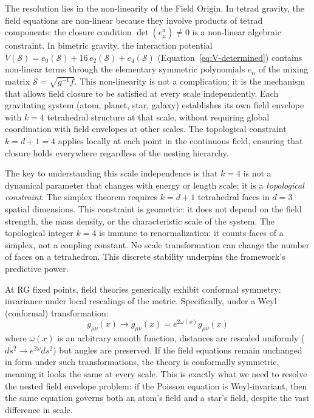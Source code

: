 \documentclass[aps,prd,preprint,superscriptaddress,showpacs,preprintnumbers,amsmath,amssymb,nofootinbib]{revtex4-2}
\begin{document}
The resolution lies in the non-linearity of the Field Origin. In tetrad gravity, the field equations are non-linear because they involve products of tetrad components: the closure condition $\det(e_\mu^a) \neq 0$ is a non-linear algebraic constraint. In bimetric gravity, the interaction potential $V(\mathcal{S}) = e_0(\mathcal{S}) + 16\,e_2(\mathcal{S}) + e_4(\mathcal{S})$ (Equation~\ref{eq:V-determined}) contains non-linear terms through the elementary symmetric polynomials $e_n$ of the mixing matrix $\mathcal{S} = \sqrt{g^{-1}f}$. This non-linearity is not a complication; it is the mechanism that allows field closure to be satisfied at every scale independently. Each gravitating system (atom, planet, star, galaxy) establishes its own field envelope with $k=4$ tetrahedral structure at that scale, without requiring global coordination with field envelopes at other scales. The topological constraint $k = d+1 = 4$ applies locally at each point in the continuous field, ensuring that closure holds everywhere regardless of the nesting hierarchy.


The key to understanding this scale independence is that $k=4$ is not a dynamical parameter that changes with energy or length scale; it is a \emph{topological constraint}. The simplex theorem requires $k = d+1$ tetrahedral faces in $d=3$ spatial dimensions. This constraint is geometric: it does not depend on the field strength, the mass density, or the characteristic scale of the system. The topological integer $k=4$ is immune to renormalization: it counts faces of a simplex, not a coupling constant. No scale transformation can change the number of faces on a tetrahedron. This discrete stability underpins the framework's predictive power.

At RG fixed points, field theories generically exhibit conformal symmetry: invariance under local rescalings of the metric. Specifically, under a Weyl (conformal) transformation:
\begin{equation}
g_{\mu\nu}(x) \to \tilde{g}_{\mu\nu}(x) = e^{2\omega(x)} g_{\mu\nu}(x)
\label{eq:weyl-transformation}
\end{equation}
where $\omega(x)$ is an arbitrary smooth function, distances are rescaled uniformly ($ds^2 \to e^{2\omega} ds^2$) but angles are preserved. If the field equations remain unchanged in form under such transformations, the theory is conformally symmetric, meaning it looks the same at every scale. This is exactly what we need to resolve the nested field envelope problem: if the Poisson equation is Weyl-invariant, then the same equation governs both an atom's field and a star's field, despite the vast difference in scale.
\end{document}
